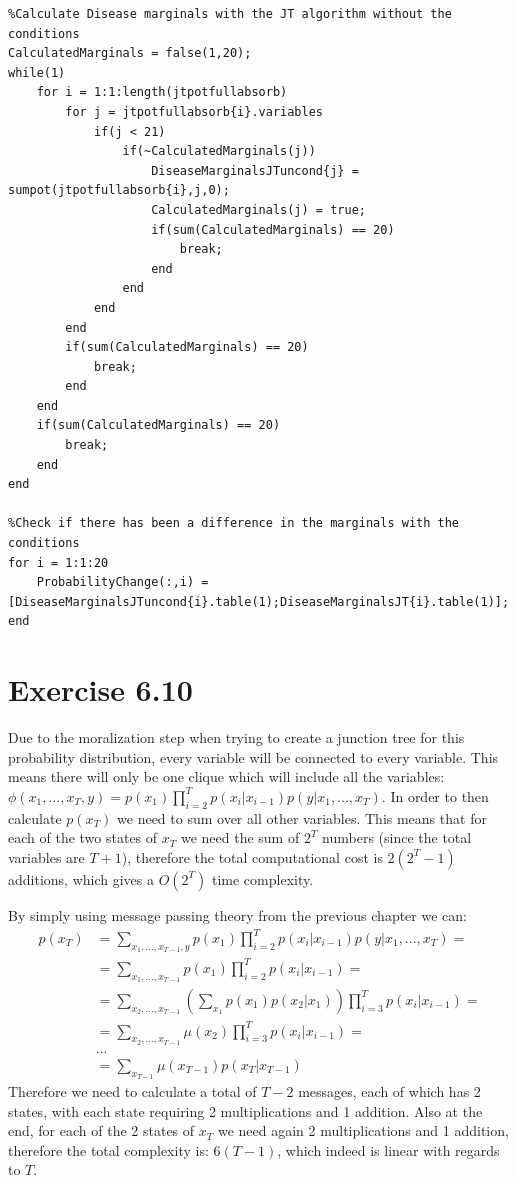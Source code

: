 \documentclass[11pt,a4paper,oneside]{report}
\begin{document}
\begin{lstlisting}
%Calculate Disease marginals with the JT algorithm without the conditions
CalculatedMarginals = false(1,20);
while(1)
    for i = 1:1:length(jtpotfullabsorb)
        for j = jtpotfullabsorb{i}.variables
            if(j < 21)
                if(~CalculatedMarginals(j))
                    DiseaseMarginalsJTuncond{j} = sumpot(jtpotfullabsorb{i},j,0);
                    CalculatedMarginals(j) = true;
                    if(sum(CalculatedMarginals) == 20)
                        break;
                    end
                end
            end
        end
        if(sum(CalculatedMarginals) == 20)
            break;
        end
    end
    if(sum(CalculatedMarginals) == 20)
        break;
    end
end

%Check if there has been a difference in the marginals with the conditions
for i = 1:1:20
    ProbabilityChange(:,i) = [DiseaseMarginalsJTuncond{i}.table(1);DiseaseMarginalsJT{i}.table(1)];
end
\end{lstlisting}

\section*{Exercise 6.10}

Due to the moralization step when trying to create a junction tree for this probability distribution, every variable will be connected to every variable. This means there will only be one clique which will include all the variables: $\phi(x_1,...,x_T,y) = p(x_1)\prod_{i=2}^Tp(x_i|x_{i-1})p(y|x_1,...,x_T)$. In order to then calculate $p(x_T)$ we need to sum over all other variables. This means that for each of the two states of $x_T$ we need the sum of $2^T$ numbers (since the total variables are $T+1$), therefore the total computational cost is $2(2^T-1)$ additions, which gives a $O(2^T)$ time complexity.

By simply using message passing theory from the previous chapter we can:
\begin{align*}
p(x_T)&=\sum_{x_1,...,x_{T-1},y}p(x_1)\prod_{i=2}^Tp(x_i|x_{i-1})p(y|x_1,...,x_T)=\\
&=\sum_{x_1,...,x_{T-1}}p(x_1)\prod_{i=2}^Tp(x_i|x_{i-1})=\\
&=\sum_{x_2,...,x_{T-1}}\left(\sum_{x_1}p(x_1)p(x_2|x_1)\right)\prod_{i=3}^Tp(x_i|x_{i-1})=\\
&=\sum_{x_2,...,x_{T-1}}\mu(x_2)\prod_{i=3}^Tp(x_i|x_{i-1})=\\
&...\\
&=\sum_{x_{T-1}}\mu(x_{T-1})p(x_T|x_{T-1})
\end{align*}
Therefore we need to calculate a total of $T-2$ messages, each of which has 2 states, with each state requiring 2 multiplications and 1 addition. Also at the end, for each of the 2 states of $x_T$ we need again 2 multiplications and 1 addition, therefore the total complexity is: $6(T-1)$, which indeed is linear with regards to $T$.
\end{document}

